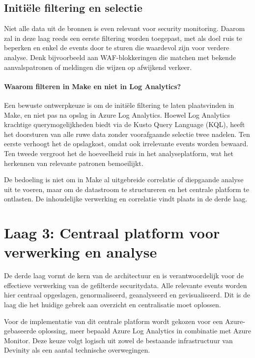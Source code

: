 \subsection{Initiële filtering en selectie}
Niet alle data uit de bronnen is even relevant voor security monitoring. Daarom zal in deze laag reeds een eerste filtering worden toegepast, met als doel ruis te beperken en enkel de events door te sturen die waardevol zijn voor verdere analyse. Denk bijvoorbeeld aan WAF-blokkeringen die matchen met bekende aanvalspatronen of meldingen die wijzen op afwijkend verkeer.

\paragraph{Waarom filteren in Make en niet in Log Analytics?}
Een bewuste ontwerpkeuze is om de initiële filtering te laten plaatsvinden in Make, en niet pas na opslag in Azure Log Analytics. Hoewel Log Analytics krachtige querymogelijkheden biedt via de Kusto Query Language (KQL), heeft het doorsturen van alle ruwe data zonder voorafgaande selectie twee nadelen. Ten eerste verhoogt het de opslagkost, omdat ook irrelevante events worden bewaard. Ten tweede vergroot het de hoeveelheid ruis in het analyseplatform, wat het herkennen van relevante patronen bemoeilijkt.

De bedoeling is niet om in Make al uitgebreide correlatie of diepgaande analyse uit te voeren, maar om de datastroom te structureren en het centrale platform te ontlasten. De inhoudelijke verwerking en correlatie vindt plaats in de derde laag.


\section{Laag 3: Centraal platform voor verwerking en analyse}
De derde laag vormt de kern van de architectuur en is verantwoordelijk voor de effectieve verwerking van de gefilterde securitydata. Alle relevante events worden hier centraal opgeslagen, genormaliseerd, geanalyseerd en gevisualiseerd. Dit is de laag die het huidige gebrek aan overzicht en centralisatie moet oplossen.

Voor de implementatie van dit centrale platform wordt gekozen voor een Azure-gebaseerde oplossing, meer bepaald Azure Log Analytics in combinatie met Azure Monitor. Deze keuze volgt logisch uit zowel de bestaande infrastructuur van Devinity als een aantal technische overwegingen.

